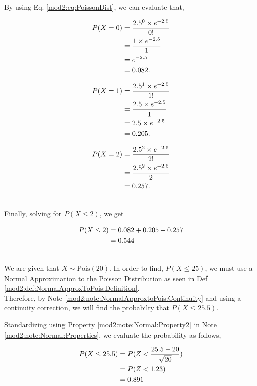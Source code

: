 \begin{subquestions}
By using Eq. \ref{mod2:eq:PoissonDist}, we can evaluate that, 

\begin{align}
	P(X = 0) & =\frac{ 2.5 ^ 0 \times e^{-2.5}}{0!} \nonumber \\
  & =\frac{1 \times e^{-2.5}}{1} \nonumber \\
  & =e^{-2.5} \nonumber \\
  & = 0.082.
\end{align}

\begin{align}
	P(X = 1) & =\frac{ 2.5 ^ 1 \times e^{-2.5}}{1!} \nonumber \\
	& =\frac{2.5 \times e^{-2.5}}{1} \nonumber \\
	& =2.5 \times e^{-2.5} \nonumber \\
	& = 0.205. 
\end{align}

\begin{align}
	P(X = 2) & =\frac{ 2.5 ^ 2 \times e^{-2.5}}{2!} \nonumber \\
	& =\frac{2.5^2 \times e^{-2.5}}{2} \nonumber \\
	& = 0.257. \\ \nonumber
\end{align}
	
	Finally, solving for $P(X \leq 2)$, we get 
	
\begin{align}
		P(X \leq 2) & = 0.082 + 0.205 + 0.257 \nonumber \\
		& = 0.544 \\ \nonumber
\end{align}


\subquestion

We are given that $X \sim \text{Pois} (20)$. In order to find, $P(X\leq 25)$, we must use a Normal Approximation to the Poisson Distribution as seen in Def \ref{mod2:def:NormalApproxToPois:Definition}.\\

Therefore, by Note \ref{mod2:note:NormalApproxtoPois:Continuity} and using a continuity correction, we will find the probabilty that $P(X \leq 25.5)$.

Standardizing using Property \ref{mod2:note:Normal:Property2} in Note \ref{mod2:note:Normal:Properties}, we evaluate the probability as follows,

\begin{align}
	P(X \leq 25.5) &= P(Z< \frac{25.5-20}{\sqrt{20}}) \nonumber \\
	&=P(Z<1.23) \nonumber \\ 
	&=0.891 \\ \nonumber 
\end{align}


\end{subquestions}
